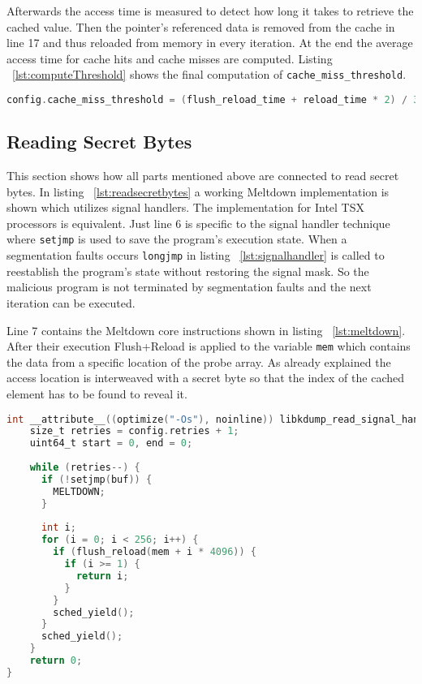 \documentclass[a4paper,oneside,openright] {scrreprt}
\begin{document}
Afterwards the access time is measured to detect how long it takes to retrieve the cached value. 
Then the pointer's referenced data is removed from the cache in line 17 and thus reloaded from memory in every iteration.
At the end the average access time for cache hits and cache misses are computed.
Listing ~\ref{lst:computeThreshold} shows the final computation of \texttt{cache\_miss\_threshold}.

\begin{lstlisting}[language=C, caption=Meltdown: Cache Miss Threshold 2, label={lst:finalthreshold}]
config.cache_miss_threshold = (flush_reload_time + reload_time * 2) / 3;
\end{lstlisting}

\subsection{Reading Secret Bytes}
\label{ch:intro:motivation:A}

This section shows how all parts mentioned above are connected to read secret bytes.
In listing ~\ref{lst:readsecretbytes} a working Meltdown implementation is shown which utilizes
signal handlers. The implementation for Intel TSX processors is equivalent.
Just line 6 is specific to the signal handler technique where \texttt{setjmp} is used to save the program's execution state.
When a segmentation faults occurs \texttt{longjmp} in listing ~\ref{lst:signalhandler} is called to reestablish the program's state
without restoring the signal mask. 
So the malicious program is not terminated by segmentation faults and the next iteration can be executed.

Line 7 contains the Meltdown core instructions shown in listing ~\ref{lst:meltdown}.
After their execution Flush+Reload is applied to the variable \texttt{mem} which contains the data
from a specific location of the probe array. As already explained the access location is interweaved with a
secret byte so that the index of the cached element has to be found to reveal it.


\begin{lstlisting}[language=C, caption=Meltdown: Reading Secret Bytes, label={lst:readsecretbytes}]
int __attribute__((optimize("-Os"), noinline)) libkdump_read_signal_handler() {
    size_t retries = config.retries + 1;
    uint64_t start = 0, end = 0;
  
    while (retries--) {
      if (!setjmp(buf)) {
        MELTDOWN;
      }
  
      int i;
      for (i = 0; i < 256; i++) {
        if (flush_reload(mem + i * 4096)) {
          if (i >= 1) {
            return i;
          }
        }
        sched_yield();
      }
      sched_yield();
    }
    return 0;
}
\end{lstlisting}
\end{document}
